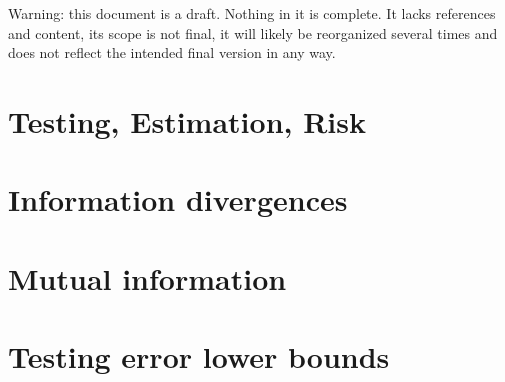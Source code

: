 %

Warning: this document is a draft. Nothing in it is complete. It lacks references and content, its scope is not final, it will likely be reorganized several times and does not reflect the intended final version in any way.



\chapter{Testing, Estimation, Risk}



\chapter{Information divergences}














\chapter{Mutual information}



\chapter{Testing error lower bounds}







\appendix




